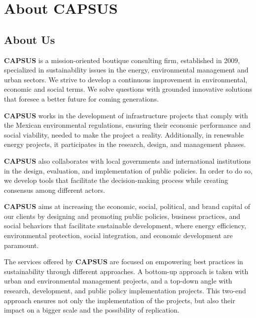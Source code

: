 \documentclass[
	a4paper,
	12pt,
	unnumberedsections,
]{CSSullivanBusinessReport}
\begin{document}
\newpage

\begin{twothirdswidth}
	\tableofcontents
\end{twothirdswidth}

\newpage

\section{About CAPSUS}
\subsection{About Us}
\textbf{CAPSUS} is a mission-oriented boutique consulting firm, established in 2009, specialized in sustainability issues in the energy, environmental management and urban sectors. We strive to develop a continuous improvement in environmental, economic and social terms. We solve questions with grounded innovative solutions that foresee a better future for coming generations.

\textbf{CAPSUS} works in the development of infrastructure projects that comply with the Mexican environmental regulations, ensuring their economic performance and social viability, needed to make the project a reality. Additionally, in renewable energy projects, it participates in the research, design, and management phases.

\textbf{CAPSUS} also collaborates with local governments and international institutions in the design, evaluation, and implementation of public policies. In order to do so, we develop tools that facilitate the decision-making process while creating consensus among different actors.

\textbf{CAPSUS} aims at increasing the economic, social, political, and brand capital of our clients by designing and promoting public policies, business practices, and social behaviors that facilitate sustainable development, where energy efficiency, environmental protection, social integration, and economic development are paramount.

The services offered by \textbf{CAPSUS} are focused on empowering best practices in sustainability through different approaches. A bottom-up approach is taken with urban and environmental management projects, and a top-down angle with research, development, and public policy implementation projects. This two-end approach ensures not only the implementation of the projects, but also their impact on a bigger scale and the possibility of replication.
\end{document}
